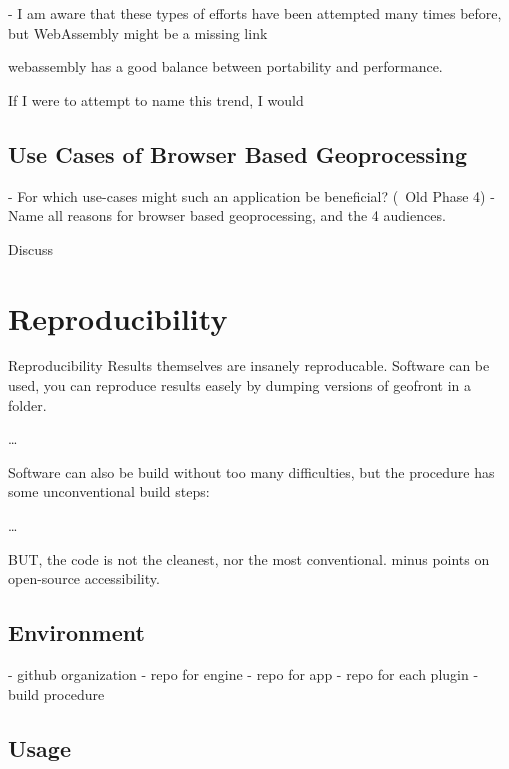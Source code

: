 - I am aware that these types of efforts have been attempted many times before, but WebAssembly might be a missing link 

\m{->} webassembly has a good balance between portability and performance.

\m{->}

If I were to attempt to name this trend, I would









\subsection{Use Cases of Browser Based Geoprocessing}



- For which use-cases might such an application be beneficial? (~Old Phase 4)
- Name all reasons for browser based geoprocessing, and the 4 audiences.

Discuss 

\section{Reproducibility}

Reproducibility
Results themselves are insanely reproducable.
Software can be used, you can reproduce results easely by dumping versions of geofront in 
a folder.

\dots

Software can also be build without too many difficulties, but the procedure has some unconventional build steps: 

\dots

BUT, the code is not the cleanest, nor the most conventional. minus points on open-source accessibility.



\subsection{Environment}%
- github organization 
- repo for engine 
- repo for app 
- repo for each plugin
- build procedure

\subsection{Usage}%

